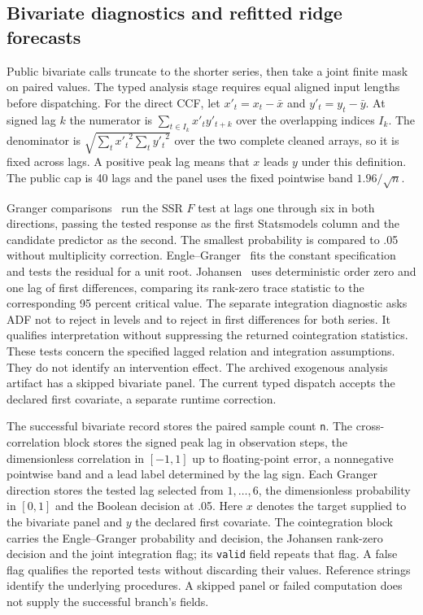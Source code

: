\subsection{Bivariate diagnostics and refitted ridge forecasts}
\label{sec:diagnostic-relations}
Public bivariate calls truncate to the shorter series, then take a joint finite mask on paired values. The typed analysis stage requires equal aligned input lengths before dispatching. For the direct CCF, let $x'_t=x_t-\bar x$ and $y'_t=y_t-\bar y$. At signed lag $k$ the numerator is $\sum_{t\in I_k}x'_t y'_{t+k}$ over the overlapping indices $I_k$. The denominator is $\sqrt{\sum_t{x'_t}^2\sum_t{y'_t}^2}$ over the two complete cleaned arrays, so it is fixed across lags. A positive peak lag means that $x$ leads $y$ under this definition. The public cap is 40 lags and the panel uses the fixed pointwise band $1.96/\sqrt n$.

Granger comparisons~\cite{granger} run the SSR $F$ test at lags one through six in both directions, passing the tested response as the first Statsmodels column and the candidate predictor as the second. The smallest probability is compared to .05 without multiplicity correction. Engle--Granger~\cite{englegranger} fits the constant specification and tests the residual for a unit root. Johansen~\cite{johansen} uses deterministic order zero and one lag of first differences, comparing its rank-zero trace statistic to the corresponding 95 percent critical value. The separate integration diagnostic asks ADF not to reject in levels and to reject in first differences for both series. It qualifies interpretation without suppressing the returned cointegration statistics. These tests concern the specified lagged relation and integration assumptions. They do not identify an intervention effect. The archived exogenous analysis artifact has a skipped bivariate panel. The current typed dispatch accepts the declared first covariate, a separate runtime correction.

The successful bivariate record stores the paired sample count \texttt{n}. The cross-correlation block stores the signed peak lag in observation steps, the dimensionless correlation in $[-1,1]$ up to floating-point error, a nonnegative pointwise band and a lead label determined by the lag sign. Each Granger direction stores the tested lag selected from $1,\ldots,6$, the dimensionless probability in $[0,1]$ and the Boolean decision at .05. Here $x$ denotes the target supplied to the bivariate panel and $y$ the declared first covariate. The cointegration block carries the Engle--Granger probability and decision, the Johansen rank-zero decision and the joint integration flag; its \texttt{valid} field repeats that flag. A false flag qualifies the reported tests without discarding their values. Reference strings identify the underlying procedures. A skipped panel or failed computation does not supply the successful branch's fields.


